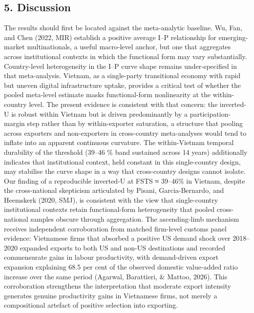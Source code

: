 \documentclass[12pt,a4paper]{article}
\begin{document}
\hypertarget{5-discussion}{%
\subsection{5. Discussion}\label{5-discussion}}

The results should first be located against the meta-analytic baseline.
Wu, Fan, and Chen (2022, MIR) establish a positive average I--P
relationship for emerging-market multinationals, a useful macro-level
anchor, but one that aggregates across institutional contexts in which
the functional form may vary substantially. Country-level heterogeneity
in the I--P curve shape remains under-specified in that meta-analysis.
Vietnam, as a single-party transitional economy with rapid but uneven
digital infrastructure uptake, provides a critical test of whether the
pooled meta-level estimate masks functional-form nonlinearity at the
within-country level. The present evidence is consistent with that
concern: the inverted-U is robust within Vietnam but is driven
predominantly by a participation-margin step rather than by
within-exporter saturation, a structure that pooling across exporters
and non-exporters in cross-country meta-analyses would tend to inflate
into an apparent continuous curvature. The within-Vietnam temporal
durability of the threshold (39--46 \% band sustained across 14 years)
additionally indicates that institutional context, held constant in this
single-country design, may stabilise the curve shape in a way that
cross-country designs cannot isolate. Our finding of a reproducible
inverted-U at FSTS ≈ 39--46\% in Vietnam, despite the cross-national
skepticism articulated by Pisani, Garcia-Bernardo, and Heemskerk (2020,
SMJ), is consistent with the view that single-country institutional
contexts retain functional-form heterogeneity that pooled cross-national
samples obscure through aggregation. The ascending-limb mechanism
receives independent corroboration from matched firm-level customs panel
evidence: Vietnamese firms that absorbed a positive US demand shock over
2018--2020 expanded exports to both US and non-US destinations and
recorded commensurate gains in labour productivity, with demand-driven
export expansion explaining 68.5 per cent of the observed domestic
value-added ratio increase over the same period (Agarwal, Barattieri, \&
Mattoo, 2026). This corroboration strengthens the interpretation that
moderate export intensity generates genuine productivity gains in
Vietnamese firms, not merely a compositional artefact of positive
selection into exporting.
\end{document}
